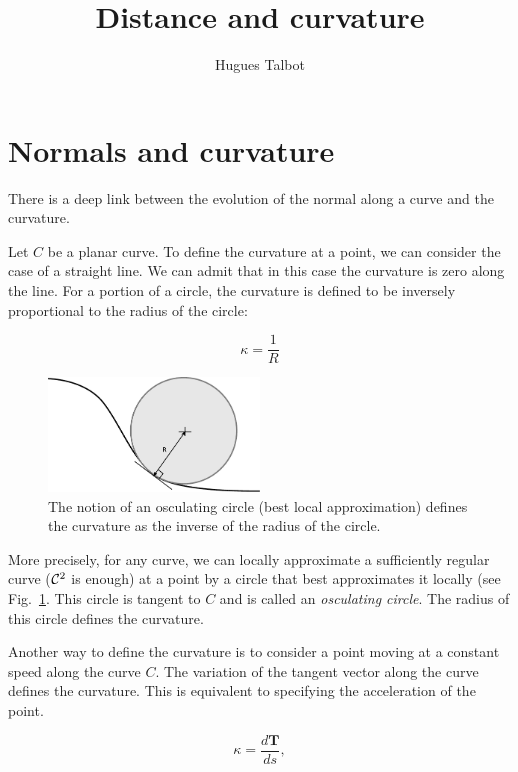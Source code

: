 \documentclass[11pt,a4paper]{article}
\title{Distance and curvature}
\author{Hugues Talbot}
\begin{document}
\maketitle
	
	
	\section{Normals and curvature}
	
	There is a deep link between the evolution of the normal along a curve and the curvature.
	
	Let $C$ be a planar curve. To define the curvature at a point, we can consider
	the case of a straight line. We can admit that in this case the curvature is zero along the line. For a portion of a circle, the curvature is defined to be inversely proportional to the radius of the circle:
	
	\begin{equation}
	\kappa = \frac{1}{R}
	\end{equation}
	
		\begin{figure}
			\centering
			\includegraphics[width=0.5\textwidth]{Drawings/Osculating.pdf}
			\caption{The notion of an osculating circle (best local approximation) defines the curvature as the inverse of the radius of the circle.\label{fig:oscul}}
		\end{figure}
	
	More precisely, for any curve, we can locally approximate a sufficiently regular curve (${\cal C}^2$ is enough) at a point by a circle that best approximates it locally (see Fig.~\ref{fig:oscul}. This circle is tangent to $C$ and is called an {\em osculating circle}. The radius of this circle defines the curvature.
	

	
	Another way to define the curvature is to consider a point moving at a constant speed along the curve $C$. The variation of the tangent vector along the curve defines the curvature. This is equivalent to specifying the acceleration of the point.
	
	\begin{equation}
	\kappa = \frac{d \mathbf{T}}{ds},
	\end{equation}
	
\end{document}
